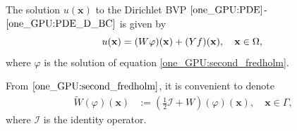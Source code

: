 \documentclass{article}
\begin{document}
The solution $u(\mathbf{x})$ to the Dirichlet BVP $\eqref{one_GPU:PDE}$-$\eqref{one_GPU:PDE_D_BC}$ is given by 
\begin{equation}
    u(\mathbf{x}) = (W\varphi)(\mathbf{x}) + (Yf)(\mathbf{x}), \quad \mathbf{x} \in \Omega, \label{One_GPU:fredholm_dirichlet} \\
\end{equation}
where $\varphi$ is the solution of equation \eqref{one_GPU:second_fredholm}.

From $\eqref{one_GPU:second_fredholm}$, it is convenient to denote 
\begin{align}
    \widetilde{W}(\varphi)(\mathbf{x}) & := (\frac{1}{2} \mathcal{I} + W)(\varphi)(\mathbf{x}), \quad \mathbf{x} \in \Gamma,
\end{align}
where $\mathcal{I}$ is the identity operator.
\end{document}
